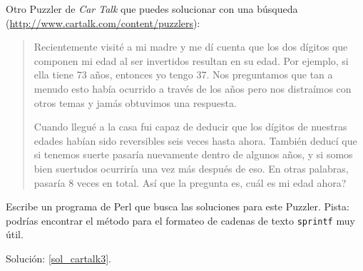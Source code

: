 \begin{exercise}
Otro Puzzler de {\em Car Talk} que puedes solucionar con una
búsqueda (\url{http://www.cartalk.com/content/puzzlers}):
\label{cartalk3}

\begin{quote}

Recientemente visité a mi madre y me dí cuenta que los dos dígitos
que componen mi edad al ser invertidos resultan en su edad. Por 
ejemplo, si ella tiene 73 años, entonces yo tengo 37. Nos preguntamos
que tan a menudo esto había ocurrido a través de los años pero nos
distraímos con otros temas y jamás obtuvimos una respuesta.

Cuando llegué a la casa fui capaz de deducir que los dígitos de
nuestras edades habían sido reversibles seis veces hasta ahora.
También deducí que si tenemos suerte pasaría nuevamente dentro de
algunos años, y si somos bien suertudos ocurriría una vez más después
de eso. En otras palabras, pasaría 8 veces en total. Así que la pregunta
es, cuál es mi edad ahora?

\end{quote}

Escribe un programa de Perl que busca las soluciones para este Puzzler.
Pista: podrías encontrar el método para el formateo de cadenas de texto
{\tt sprintf} muy útil.

Solución: \ref{sol_cartalk3}.

\end{exercise}
